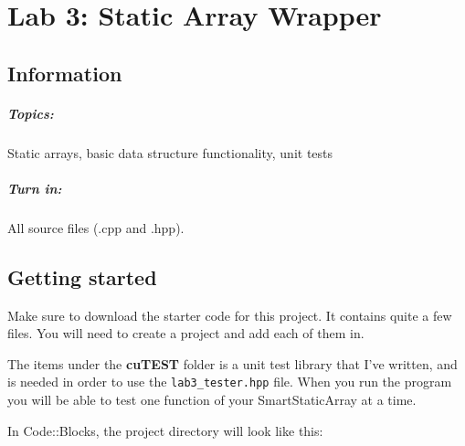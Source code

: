 \documentclass[a4paper,12pt]{book}
\title{}
\author{Rachel Morris}
\date{\today}
\begin{document}
    \chapter*{Lab 3: Static Array Wrapper} 

        \section*{Information}
            \paragraph{ Topics: } Static arrays, basic data structure functionality, unit tests
            \paragraph{ Turn in: } All source files (.cpp and .hpp).


        \section*{Getting started}

            Make sure to download the starter code for this project.
            It contains quite a few files. You will need to create
            a project and add each of them in.

            
\begin{framed}
\end{framed}

            The items under the \textbf{cuTEST} folder is a unit test
            library that I've written, and is needed in order to use
            the \texttt{lab3\_tester.hpp} file. When you run the program
            you will be able to test one function of your SmartStaticArray
            at a time.

            \newpage
            In Code::Blocks, the project directory will look like this: ~\\
\end{document}
